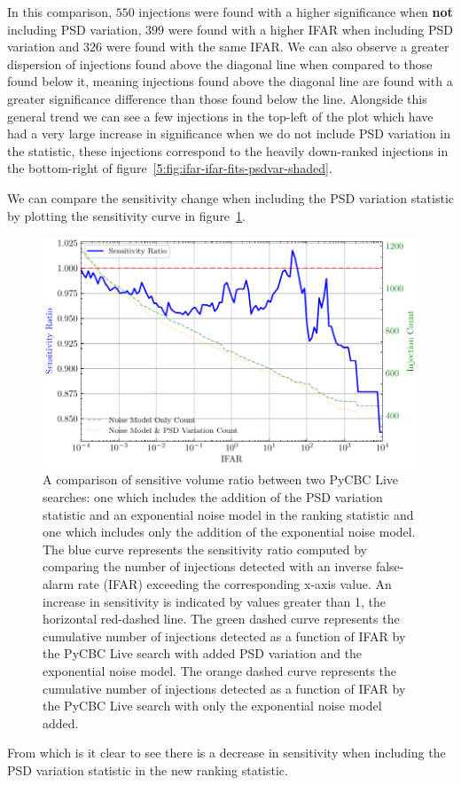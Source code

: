 %
In this comparison, $550$ injections were found with a higher significance when \textbf{not} including PSD variation, $399$ were found with a higher IFAR when including PSD variation and $326$ were found with the same IFAR. We can also observe a greater dispersion of injections found above the diagonal line when compared to those found below it, meaning injections found above the diagonal line are found with a greater significance difference than those found below the line. Alongside this general trend we can see a few injections in the top-left of the plot which have had a very large increase in significance when we do not include PSD variation in the statistic, these injections correspond to the heavily down-ranked injections in the bottom-right of figure~\ref{5:fig:ifar-ifar-fits-psdvar-shaded}.

We can compare the sensitivity change when including the PSD variation statistic by plotting the sensitivity curve in figure~\ref{5:fig:vt-ratio-f-fo}.
%
\begin{figure}
       \centering
    \includegraphics[width=1.0\textwidth]{images/5_pycbclive/fits-only/fits_only_fits_psd_vt_ratio.pdf}
    \caption{A comparison of sensitive volume ratio between two PyCBC Live searches: one which includes the addition of the PSD variation statistic and an exponential noise model in the ranking statistic and one which includes only the addition of the exponential noise model. The blue curve represents the sensitivity ratio computed by comparing the number of injections detected with an inverse false-alarm rate (IFAR) exceeding the corresponding x-axis value. An increase in sensitivity is indicated by values greater than 1, the horizontal red-dashed line. The green dashed curve represents the cumulative number of injections detected as a function of IFAR by the PyCBC Live search with added PSD variation and the exponential noise model. The orange dashed curve represents the cumulative number of injections detected as a function of IFAR by the PyCBC Live search with only the exponential noise model added.}
    \label{5:fig:vt-ratio-f-fo}
\end{figure}
%
From which is it clear to see there is a decrease in sensitivity when including the PSD variation statistic in the new ranking statistic.

